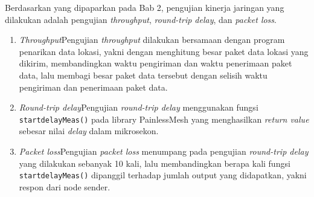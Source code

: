 Berdasarkan yang dipaparkan pada Bab 2, pengujian kinerja jaringan yang dilakukan adalah pengujian \textit{throughput}, \textit{round-trip delay}, dan \textit{packet loss}.
\begin{enumerate}
	\item \textit{Throughput}\newline Pengujian \textit{throughput} dilakukan bersamaan dengan program penarikan data lokasi, yakni dengan menghitung besar paket data lokasi yang dikirim, membandingkan waktu pengiriman dan waktu penerimaan paket data, lalu membagi besar paket data tersebut dengan selisih waktu pengiriman dan penerimaan paket data.
	\item \textit{Round-trip delay}\newline Pengujian \textit{round-trip delay} menggunakan fungsi \verb|startdelayMeas()| pada library PainlessMesh yang menghasilkan \textit{return value} sebesar nilai \textit{delay} dalam mikrosekon.
	\item \textit{Packet loss}\newline Pengujian \textit{packet loss} menumpang pada pengujian \textit{round-trip delay} yang dilakukan sebanyak 10 kali, lalu membandingkan berapa kali fungsi \verb|startdelayMeas()| dipanggil terhadap jumlah output yang didapatkan, yakni respon dari node sender.
\end{enumerate}